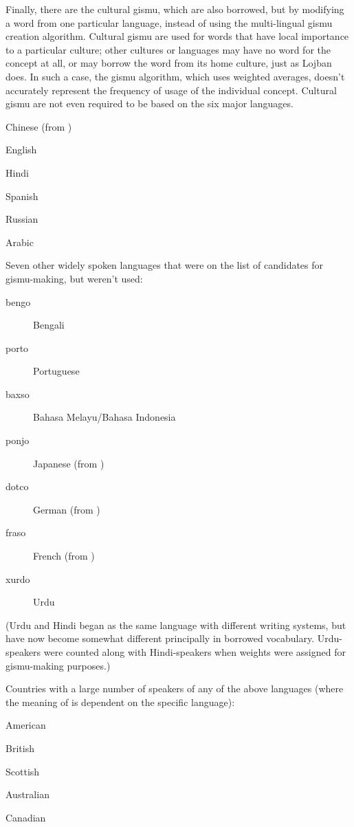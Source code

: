 Finally, there are the cultural gismu, which are also borrowed, but by modifying a word from one particular language, instead of using the multi-lingual gismu creation algorithm. Cultural gismu are used for words that have local importance to a particular culture; other cultures or languages may have no word for the concept at all, or may borrow the word from its home culture, just as Lojban does. In such a case, the gismu algorithm, which uses weighted averages, doesn't accurately represent the frequency of usage of the individual concept. Cultural gismu are not even required to be based on the six major languages.
\begin{description}
\item[jungo]{Chinese (from )}
\item[glico]{English}
\item[xindo]{Hindi}
\item[spano]{Spanish}
\item[rusko]{Russian}
\item[xrabo]{Arabic}
\end{description}

{\noindent}Seven other widely spoken languages that were on the list of candidates for gismu-making, but weren't used:
\begin{description}
\item[bengo]{Bengali}
\item[porto]{Portuguese}
\item[baxso]{Bahasa Melayu/Bahasa Indonesia}
\item[ponjo]{Japanese (from )}
\item[dotco]{German (from )}
\item[fraso]{French (from )}
\item[xurdo]{Urdu}
\end{description}

(Urdu and Hindi began as the same language with different writing systems, but have now become somewhat different principally in borrowed vocabulary. Urdu-speakers were counted along with Hindi-speakers when weights were assigned for gismu-making purposes.) 

Countries with a large number of speakers of any of the above languages (where the meaning of  is dependent on the specific language):
\begin{description}[English]
\item[merko]{American}
\item[brito]{British}
\item[skoto]{Scottish}
\item[sralo]{Australian}
\item[kadno]{Canadian}
\end{description}

